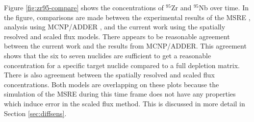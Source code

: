 \documentclass{style/nseJournal}
\begin{document}
Figure \ref{fig:zr95-compare} shows the concentrations of $^{95}$Zr and $^{95}$Nb over time.
In the figure, comparisons are made between the experimental results of the MSRE \cite{compere1975fission}, analysis using MCNP/ADDER \cite{fei_validation_2022}, and the current work using the spatially resolved and scaled flux models.
There appears to be reasonable agreement between the current work and the results from MCNP/ADDER.
This agreement shows that the six to seven nuclides are sufficient to get a reasonable concentration for a specific target nuclide compared to a full depletion matrix.
There is also agreement between the spatially resolved and scaled flux concentrations.
Both models are overlapping on these plots because the simulation of the MSRE during this time frame does not have any properties which induce error in the scaled flux method.
This is discussed in more detail in Section \ref{sec:diffsens}.



\end{document}
